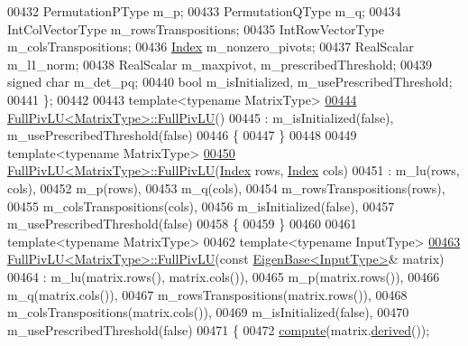 \begin{DoxyCode}
00432     PermutationPType m\_p;
00433     PermutationQType m\_q;
00434     IntColVectorType m\_rowsTranspositions;
00435     IntRowVectorType m\_colsTranspositions;
00436     \hyperlink{group___core___module_a554f30542cc2316add4b1ea0a492ff02}{Index} m\_nonzero\_pivots;
00437     RealScalar m\_l1\_norm;
00438     RealScalar m\_maxpivot, m\_prescribedThreshold;
00439     \textcolor{keywordtype}{signed} \textcolor{keywordtype}{char} m\_det\_pq;
00440     \textcolor{keywordtype}{bool} m\_isInitialized, m\_usePrescribedThreshold;
00441 \};
00442 
00443 \textcolor{keyword}{template}<\textcolor{keyword}{typename} MatrixType>
\hyperlink{group___l_u___module_af225528d1c6e623a2b1dce091907d13e}{00444} \hyperlink{group___l_u___module_af225528d1c6e623a2b1dce091907d13e}{FullPivLU<MatrixType>::FullPivLU}()
00445   : m\_isInitialized(false), m\_usePrescribedThreshold(false)
00446 \{
00447 \}
00448 
00449 \textcolor{keyword}{template}<\textcolor{keyword}{typename} MatrixType>
\hyperlink{group___l_u___module_ae83ebd2a24088f04e3ac835b0dc001e1}{00450} \hyperlink{group___l_u___module_af225528d1c6e623a2b1dce091907d13e}{FullPivLU<MatrixType>::FullPivLU}(\hyperlink{group___core___module_a554f30542cc2316add4b1ea0a492ff02}{Index} rows, 
      \hyperlink{group___core___module_a554f30542cc2316add4b1ea0a492ff02}{Index} cols)
00451   : m\_lu(rows, cols),
00452     m\_p(rows),
00453     m\_q(cols),
00454     m\_rowsTranspositions(rows),
00455     m\_colsTranspositions(cols),
00456     m\_isInitialized(false),
00457     m\_usePrescribedThreshold(false)
00458 \{
00459 \}
00460 
00461 \textcolor{keyword}{template}<\textcolor{keyword}{typename} MatrixType>
00462 \textcolor{keyword}{template}<\textcolor{keyword}{typename} InputType>
\hyperlink{group___l_u___module_a31a6a984478a9f721f367667fe4c5ab1}{00463} \hyperlink{group___l_u___module_af225528d1c6e623a2b1dce091907d13e}{FullPivLU<MatrixType>::FullPivLU}(\textcolor{keyword}{const} 
      \hyperlink{group___core___module_struct_eigen_1_1_eigen_base}{EigenBase<InputType>}& matrix)
00464   : m\_lu(matrix.rows(), matrix.cols()),
00465     m\_p(matrix.rows()),
00466     m\_q(matrix.cols()),
00467     m\_rowsTranspositions(matrix.rows()),
00468     m\_colsTranspositions(matrix.cols()),
00469     m\_isInitialized(false),
00470     m\_usePrescribedThreshold(false)
00471 \{
00472   \hyperlink{group___l_u___module_a0a3c3b1bbafa31a03567a4573ebabc79}{compute}(matrix.\hyperlink{group___core___module_a324b16961a11d2ecfd2d1b7dd7946545}{derived}());

\end{DoxyCode}

